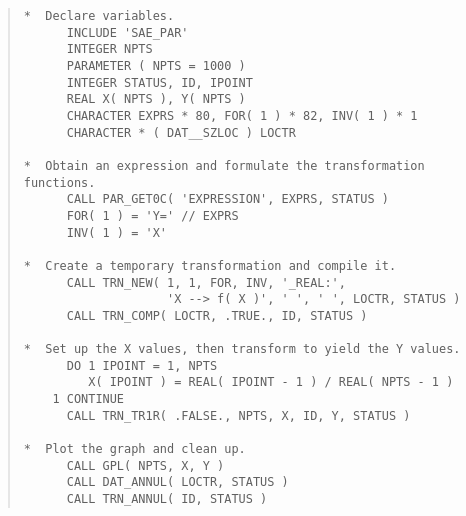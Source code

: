 \documentclass[twoside,11pt]{article}
\newcommand{\numcir}[1]{\mbox{\hspace{3ex}\fbox{#1}}}
\begin{document}
\begin{quote}
\begin{tabbing}
\verb#*  Declare variables.                                  #\\
\verb#      INCLUDE 'SAE_PAR'                                #\\
\verb#      INTEGER NPTS                                     #\\
\verb#      PARAMETER ( NPTS = 1000 )                        #\\
\verb#      INTEGER STATUS, ID, IPOINT                       #\\
\verb#      REAL X( NPTS ), Y( NPTS )                        #\\
\verb#      CHARACTER EXPRS * 80, FOR( 1 ) * 82, INV( 1 ) * 1#\\
\verb#      CHARACTER * ( DAT__SZLOC ) LOCTR                 #\\
\verb#                                                       #\\
\verb#*  Obtain an expression and formulate the transformation functions.#\\
\verb#      CALL PAR_GET0C( 'EXPRESSION', EXPRS, STATUS )    #\numcir{1}\\
\verb#      FOR( 1 ) = 'Y=' // EXPRS                         #\\
\verb#      INV( 1 ) = 'X'                                   #\\
\verb#                                                       #\\
\verb#*  Create a temporary transformation and compile it.   #\\
\verb#      CALL TRN_NEW( 1, 1, FOR, INV, '_REAL:',          #\numcir{2}\\
\verb#                    'X --> f( X )', ' ', ' ', LOCTR, STATUS )#\\
\verb#      CALL TRN_COMP( LOCTR, .TRUE., ID, STATUS )       #\\
\verb#                                                       #\\
\verb#*  Set up the X values, then transform to yield the Y values.#\\
\verb#      DO 1 IPOINT = 1, NPTS                            #\\
\verb#         X( IPOINT ) = REAL( IPOINT - 1 ) / REAL( NPTS - 1 )#\\
\verb#    1 CONTINUE                                         #\\
\verb#      CALL TRN_TR1R( .FALSE., NPTS, X, ID, Y, STATUS ) #\numcir{3}\\
\verb#                                                       #\\
\verb#*  Plot the graph and clean up.                        #\\
\verb#      CALL GPL( NPTS, X, Y )                           #\numcir{4}\\
\verb#      CALL DAT_ANNUL( LOCTR, STATUS )                  #\numcir{5}\\
\verb#      CALL TRN_ANNUL( ID, STATUS )                     #

\end{tabbing}
\end{quote}
\end{document}
